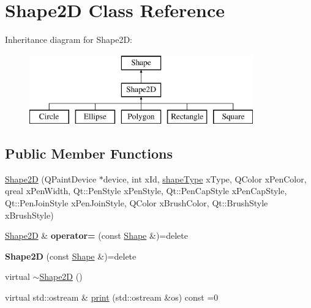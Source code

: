 \hypertarget{classShape2D}{\section{Shape2\-D Class Reference}
\label{classShape2D}
}
Inheritance diagram for Shape2\-D\-:\begin{figure}[H]
\begin{center}
\leavevmode
\includegraphics[height=3.000000cm]{classShape2D}
\end{center}
\end{figure}
\subsection*{Public Member Functions}
\begin{DoxyCompactItemize}
\item 
\hyperlink{classShape2D_ac890aa93495c70461761925145232d11}{Shape2\-D} (Q\-Paint\-Device $\ast$device, int x\-Id, \hyperlink{classShape_aaac58aa2f6760d0f06ec1710d5123e9b}{shape\-Type} x\-Type, Q\-Color x\-Pen\-Color, qreal x\-Pen\-Width, Qt\-::\-Pen\-Style x\-Pen\-Style, Qt\-::\-Pen\-Cap\-Style x\-Pen\-Cap\-Style, Qt\-::\-Pen\-Join\-Style x\-Pen\-Join\-Style, Q\-Color x\-Brush\-Color, Qt\-::\-Brush\-Style x\-Brush\-Style)
\item 
\hypertarget{classShape2D_a54dbc4873b59a4521937add746c2153e}{\hyperlink{classShape2D}{Shape2\-D} \& {\bfseries operator=} (const \hyperlink{classShape}{Shape} \&)=delete}\label{classShape2D_a54dbc4873b59a4521937add746c2153e}

\item 
\hypertarget{classShape2D_ae8b380001f180357fa4e80196eb3d20b}{{\bfseries Shape2\-D} (const \hyperlink{classShape}{Shape} \&)=delete}\label{classShape2D_ae8b380001f180357fa4e80196eb3d20b}

\item 
virtual \hyperlink{classShape2D_ad151443d27b1861c3de7b6b7147c1019}{$\sim$\-Shape2\-D} ()
\item 
virtual std\-::ostream \& \hyperlink{classShape2D_a6faf0b7950ea77a2ec6f29a31d65a624}{print} (std\-::ostream \&os) const =0
\end{DoxyCompactItemize}

